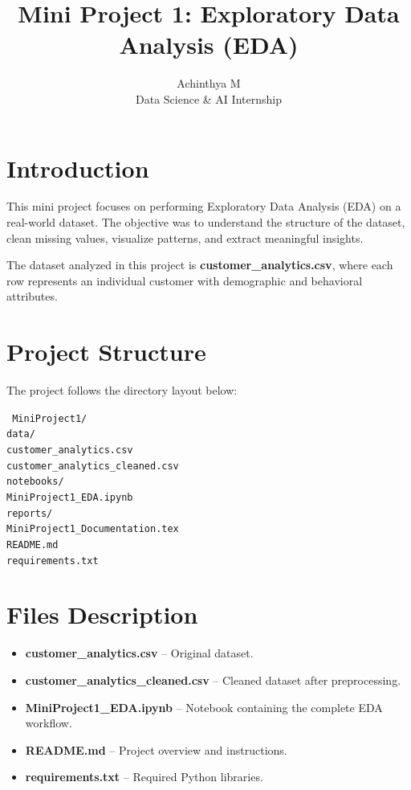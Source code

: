 \documentclass[12pt]{article}
\title{\textbf{Mini Project 1: Exploratory Data Analysis (EDA)}}
\author{Achinthya M \\ Data Science \& AI Internship}
\date{}
\begin{document}
	
	\maketitle
	\thispagestyle{empty}
	
	\tableofcontents
	\newpage
	
	\section{Introduction}
	
	This mini project focuses on performing Exploratory Data Analysis (EDA) on a real-world dataset. The objective was to understand the structure of the dataset, clean missing values, visualize patterns, and extract meaningful insights.
	
	The dataset analyzed in this project is \textbf{customer\_analytics.csv}, where each row represents an individual customer with demographic and behavioral attributes.
	
	\section{Project Structure}
	
	The project follows the directory layout below:
	
	\begin{flushleft}
		\texttt{
			MiniProject1/\\
			\quad data/\\
			\quad\quad customer\_analytics.csv\\
			\quad\quad customer\_analytics\_cleaned.csv\\
			\quad notebooks/\\
			\quad\quad MiniProject1\_EDA.ipynb\\
			\quad reports/\\
			\quad\quad MiniProject1\_Documentation.tex\\
			\quad README.md\\
			\quad requirements.txt
		}
	\end{flushleft}
	
	\section{Files Description}
	
	\begin{itemize}[leftmargin=1.5cm]
		\item \textbf{customer\_analytics.csv} – Original dataset.
		\item \textbf{customer\_analytics\_cleaned.csv} – Cleaned dataset after preprocessing.
		\item \textbf{MiniProject1\_EDA.ipynb} – Notebook containing the complete EDA workflow.
		\item \textbf{README.md} – Project overview and instructions.
		\item \textbf{requirements.txt} – Required Python libraries.
	\end{itemize}
	
\end{document}
